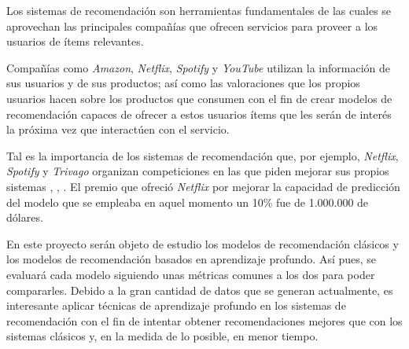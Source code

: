 Los sistemas de recomendación son herramientas fundamentales de las cuales se aprovechan las principales compañías que ofrecen servicios para proveer a los usuarios de ítems relevantes.

Compañías como \textit{Amazon}, \textit{Netflix}, \textit{Spotify} y \textit{YouTube} utilizan la información de sus usuarios y de sus productos; así como las valoraciones que los propios usuarios hacen sobre los productos que consumen con el fin de crear modelos de recomendación capaces de ofrecer a estos usuarios ítems que les serán de interés la próxima vez que interactúen con el servicio.

Tal es la importancia de los sistemas de recomendación que, por ejemplo, \textit{Netflix}, \textit{Spotify} y \textit{Trivago} organizan competiciones en las que piden mejorar sus propios sistemas \cite{wiki:Netflix_Prize}, \cite{spotify}, \cite{trivago}. El premio que ofreció \textit{Netflix} por mejorar la capacidad de predicción del modelo que se empleaba en aquel momento un 10\% fue de 1.000.000 de dólares.

En este proyecto serán objeto de estudio los modelos de recomendación clásicos y los modelos de recomendación basados en aprendizaje profundo. Así pues, se evaluará cada modelo siguiendo unas métricas comunes a los dos para poder compararles. Debido a la gran cantidad de datos que se generan actualmente, es interesante aplicar técnicas de aprendizaje profundo en los sistemas de recomendación con el fin de intentar obtener recomendaciones mejores que con los sistemas clásicos y, en la medida de lo posible, en menor tiempo.

